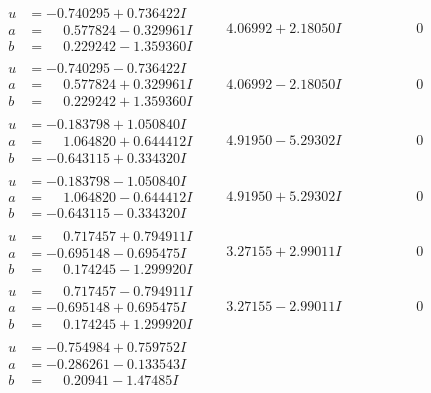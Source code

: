 \documentclass[1p]{elsarticle_modified}
\theoremstyle{definition}
\begin{document}
$$\begin{array}{c|c|c}
\begin{aligned}
u &= -0.740295 + 0.736422 I \\
a &= \phantom{-}0.577824 - 0.329961 I \\
b &= \phantom{-}0.229242 - 1.359360 I\end{aligned}
 & \phantom{-}4.06992 + 2.18050 I & \phantom{-0.000000 } 0 \\ \hline\begin{aligned}
u &= -0.740295 - 0.736422 I \\
a &= \phantom{-}0.577824 + 0.329961 I \\
b &= \phantom{-}0.229242 + 1.359360 I\end{aligned}
 & \phantom{-}4.06992 - 2.18050 I & \phantom{-0.000000 } 0 \\ \hline\begin{aligned}
u &= -0.183798 + 1.050840 I \\
a &= \phantom{-}1.064820 + 0.644412 I \\
b &= -0.643115 + 0.334320 I\end{aligned}
 & \phantom{-}4.91950 - 5.29302 I & \phantom{-0.000000 } 0 \\ \hline\begin{aligned}
u &= -0.183798 - 1.050840 I \\
a &= \phantom{-}1.064820 - 0.644412 I \\
b &= -0.643115 - 0.334320 I\end{aligned}
 & \phantom{-}4.91950 + 5.29302 I & \phantom{-0.000000 } 0 \\ \hline\begin{aligned}
u &= \phantom{-}0.717457 + 0.794911 I \\
a &= -0.695148 - 0.695475 I \\
b &= \phantom{-}0.174245 - 1.299920 I\end{aligned}
 & \phantom{-}3.27155 + 2.99011 I & \phantom{-0.000000 } 0 \\ \hline\begin{aligned}
u &= \phantom{-}0.717457 - 0.794911 I \\
a &= -0.695148 + 0.695475 I \\
b &= \phantom{-}0.174245 + 1.299920 I\end{aligned}
 & \phantom{-}3.27155 - 2.99011 I & \phantom{-0.000000 } 0 \\ \hline\begin{aligned}
u &= -0.754984 + 0.759752 I \\
a &= -0.286261 - 0.133543 I \\
b &= \phantom{-}0.20941 - 1.47485 I\end{aligned}

\end{array}$$
\end{document}
